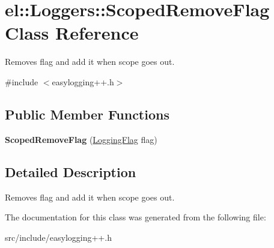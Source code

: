 \hypertarget{classel_1_1_loggers_1_1_scoped_remove_flag}{}\section{el\+:\+:Loggers\+:\+:Scoped\+Remove\+Flag Class Reference}
\label{classel_1_1_loggers_1_1_scoped_remove_flag}


Removes flag and add it when scope goes out.  




{\ttfamily \#include $<$easylogging++.\+h$>$}

\subsection*{Public Member Functions}
\begin{DoxyCompactItemize}
\item 
\mbox{\label{classel_1_1_loggers_1_1_scoped_remove_flag_a7ae9a1cde34e1145d8b90b639cc12dc1}} 
{\bfseries Scoped\+Remove\+Flag} (\hyperlink{namespaceel_a2784aacd04cb7816ac1c0b20fcbf83cb}{Logging\+Flag} flag)
\end{DoxyCompactItemize}


\subsection{Detailed Description}
Removes flag and add it when scope goes out. 

The documentation for this class was generated from the following file\+:\begin{DoxyCompactItemize}
\item 
src/include/easylogging++.\+h\end{DoxyCompactItemize}
